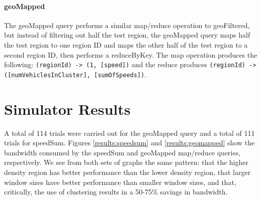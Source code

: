 \documentclass{thesis}
\begin{document}
    \paragraph{geoMapped}
        The geoMapped query performs a similar map/reduce operation to geoFiltered, but instead of filtering out half the
        test region, the geoMapped query maps half the test region to one region ID and maps the other half of the
        test region to a second region ID, then performs a reduceByKey. The map operation produces the following:
        \verb|(regionId) -> (1, [speed])| and the reduce produces \verb|(regionId) -> ([numVehiclesInCluster], [sumOfSpeeds])|.

\section{Simulator Results}

   A total of 114 trials were carried out for the geoMapped query and a total of 111 trials for speedSum.
   Figures \ref{results:speedsum} and \ref{results:geomapped} show the bandwidth consumed by the speedSum
   and geoMapped map/reduce queries, respectively. We see from both sets of graphs the same pattern: that
   the higher density region has better performance than the lower density region, that larger window
   sizes have better performance than smaller window sizes, and that, critically, the use of clustering
   results in a 50-75\% savings in bandwidth.
\end{document}
